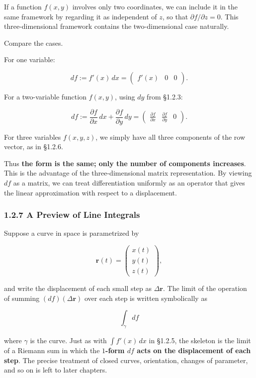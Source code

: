 \documentclass[a4paper,12pt,openany]{book}
\begin{document}
If a function \(f(x,y)\) involves only two coordinates, we can include
it in the same framework by regarding it as independent of \(z\), so
that \(\partial f/\partial z=0\). This three-dimensional framework
contains the two-dimensional case naturally.

Compare the cases.

For one variable:

\[
df:=f'(x)\,dx=\begin{pmatrix}f'(x)&0&0\end{pmatrix}.
\]

For a two-variable function \(f(x,y)\), using \(dy\) from §1.2.3:

\[
df:=\frac{\partial f}{\partial x}\,dx+
\frac{\partial f}{\partial y}\,dy
=
\begin{pmatrix}
\frac{\partial f}{\partial x}&
\frac{\partial f}{\partial y}&0
\end{pmatrix}.
\]

For three variables \(f(x,y,z)\), we simply have all three components of
the row vector, as in §1.2.6.

Thus
\textbf{the form is the same; only the number of components increases}.
This is the advantage of the three-dimensional matrix representation. By
viewing \(df\) as a matrix, we can treat differentiation uniformly as an
operator that gives the linear approximation with respect to a
displacement.

\hypertarget{a-preview-of-line-integrals}{%
\subsubsection{1.2.7 A Preview of Line
Integrals}\label{a-preview-of-line-integrals}}

Suppose a curve in space is parametrized by

\[
\mathbf{r}(t)=\begin{pmatrix}x(t)\\y(t)\\z(t)\end{pmatrix},
\]

and write the displacement of each small step as \(\Delta\mathbf{r}\).
The limit of the operation of summing \((df)(\Delta\mathbf{r})\) over
each step is written symbolically as

\[
\int_\gamma df
\]

where \(\gamma\) is the curve. Just as with \(\int f'(x)\,dx\) in
§1.2.5, the skeleton is the limit of a Riemann sum in which the
\textbf{$1$-form $df$ acts on the displacement of each step}. The
precise treatment of closed curves, orientation, changes of parameter,
and so on is left to later chapters.
\end{document}
